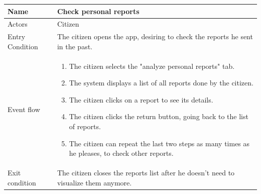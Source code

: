 \vskip 0.2in
\begin{tabular}{|p{3.1cm}|p{11.6cm}|}
	\hline
	Name & Check personal reports\\
	\hline
	Actors & Citizen\\
	\hline
	Entry Condition & The citizen opens the app, desiring to check the reports he sent in the past.\\
	\hline
	Event flow & \begin{enumerate}
		\item The citizen selects the "analyze personal reports" tab.
		\item The system displays a list of all reports done by the citizen.
		\item The citizen clicks on a report to see its details.
		\item The citizen clicks the return button, going back to the list of reports.
		\item The citizen can repeat the last two steps as many times as he pleases, to check other reports.
	\end{enumerate}\\
	\hline
	Exit condition & The citizen closes the reports list after he doesn't need to visualize them anymore.\\
	\hline
\end{tabular}

